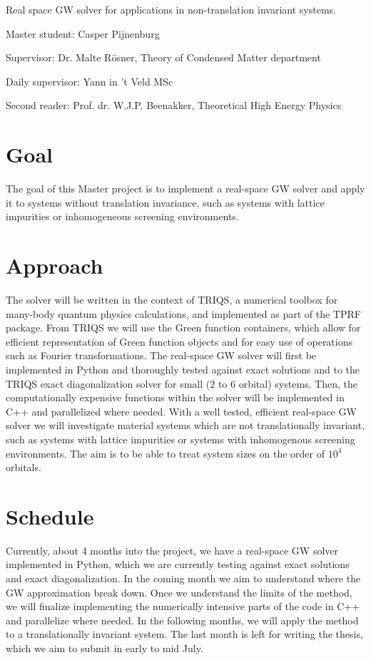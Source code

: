 \documentclass[11pt]{article}
\begin{document}
\begin{center}
\huge
{Real space GW solver for applications in non-translation invariant systems.}

\vspace{0.5cm}
\large
{Master student: Casper Pijnenburg}

\vspace{0.1cm}
\large
{Supervisor: Dr. Malte Rösner, Theory of Condensed Matter department}

\vspace{0.1cm}
\large
{Daily supervisor: Yann in 't Veld MSc}

\vspace{0.1cm}
\large
{Second reader: Prof. dr. W.J.P. Beenakker, Theoretical High Energy Physics}

\end{center}
\section*{Goal}
The goal of this Master project is to implement a real-space GW solver and apply it to systems without
translation invariance, such as systems with lattice impurities or inhomogeneous screening environments.
\section*{Approach}
The solver will be written in the context of TRIQS, a numerical toolbox for many-body quantum physics calculations, and implemented as part of the TPRF package.
From TRIQS we will use the Green function containers, which allow for efficient representation of Green function objects and for easy use of operations such as Fourier transformations. The real-space GW solver will first be implemented in Python and thoroughly tested against exact solutions and to the TRIQS exact diagonalization solver for small (2 to 6 orbital) systems. Then, the computationally expensive functions within the solver will be implemented in C++ and parallelized where needed.
With a well tested, efficient real-space GW solver we will investigate material systems which are not translationally invariant, such as systems with lattice impurities or systems with inhomogenous screening environments. The aim is to be able to treat system sizes on the order of $10^4$ orbitals.
\section*{Schedule}
Currently, about 4 months into the project, we have a real-space GW solver implemented in Python, which we are currently testing against exact solutions and exact diagonalization. In the coming month we aim to understand where the GW approximation break down.
Once we understand the limits of the method, we will finalize implementing the numerically intensive parts of the code in C++ and parallelize where needed. In the following months, we will apply the method to a translationally invariant system.
The last month is left for writing the thesis, which we aim to submit in early to mid July.
\thispagestyle{empty}
\end{document}
